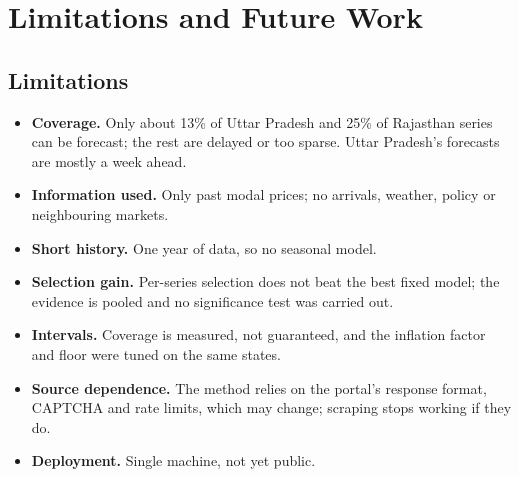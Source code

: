 \documentclass[12pt,a4paper,oneside]{report}
\numberwithin{equation}{chapter}
\numberwithin{figure}{chapter}
\numberwithin{table}{chapter}
\theoremstyle{definition}
\begin{document}
\chapter{Limitations and Future Work}

\section{Limitations}
\begin{itemize}
  \item \textbf{Coverage.} Only about 13\% of Uttar Pradesh and 25\% of Rajasthan series can be forecast; the rest are delayed or too sparse. Uttar Pradesh's forecasts are mostly a week ahead.
  \item \textbf{Information used.} Only past modal prices; no arrivals, weather, policy or neighbouring markets.
  \item \textbf{Short history.} One year of data, so no seasonal model.
  \item \textbf{Selection gain.} Per-series selection does not beat the best fixed model; the evidence is pooled and no significance test was carried out.
  \item \textbf{Intervals.} Coverage is measured, not guaranteed, and the inflation factor and floor were tuned on the same states.
  \item \textbf{Source dependence.} The method relies on the portal's response format, CAPTCHA and rate limits, which may change; scraping stops working if they do.
  \item \textbf{Deployment.} Single machine, not yet public.
\end{itemize}
\end{document}
